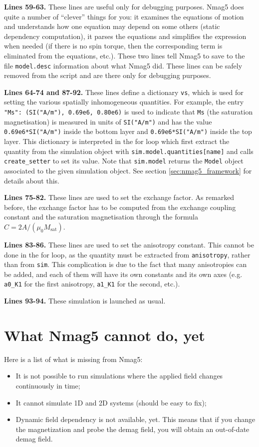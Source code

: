 \documentclass[11pt,oneside,openany]{article}
\newcommand{\Ms}{M_{\mathrm{sat}}}
\begin{document}
\textbf{Lines 59-63.} These lines are useful only for debugging purposes.
Nmag5 does quite a number of ``clever'' things for you: it examines
the equations of motion and understands how one equation may depend on
some others (static dependency computation), it parses the equations
and simplifies the expression when needed (if there is no spin torque, then
the corresponding term is eliminated from the equations, etc.).
These two lines tell Nmag5 to save to the file \verb|model.desc| information
about what Nmag5 did. These lines can be safely removed from the script
and are there only for debugging purposes.

\textbf{Lines 64-74 and 87-92.} These lines define a dictionary \verb|vs|,
which is used for setting the various spatially inhomogeneous quantities. For
example, the entry \verb|"Ms": (SI("A/m"), 0.69e6, 0.80e6)| is used to indicate
that \verb|Ms| (the saturation magnetisation) is measured in units of
\verb|SI("A/m")| and has the value \verb|0.69e6*SI("A/m")| inside the bottom
layer and \verb|0.69e6*SI("A/m")| inside the top layer. This dictionary is
interpreted in the for loop which first extract the quantity from the
simulation object with \verb|sim.model.quantities[name]| and calls
\verb|create_setter| to set its value. Note that \verb|sim.model| returns
the \verb|Model| object associated to the given simulation object.
See section \ref{sec:nmag5_framework} for details about this.

\textbf{Lines 75-82.} These lines are used to set the exchange factor.
As remarked before, the exchange factor has to be computed from the
exchange coupling constant and the saturation magnetisation through
the formula $C = 2A/(\mu_0 \Ms)$.

\textbf{Lines 83-86.} These lines are used to set the anisotropy constant.
This cannot be done in the for loop, as the quantity must be extracted from
\verb|anisotropy|, rather than from \verb|sim|. This complication is due
to the fact that many anisotropies can be added, and each of them will have
its own constants and its own axes (e.g. \verb|a0_K1| for the first
anisotropy, \verb|a1_K1| for the second, etc.).

\textbf{Lines 93-94.} These simulation is launched as usual.

\section{What Nmag5 cannot do, yet} \label{sec:missing_from_nmag5}
Here is a list of what is missing from Nmag5:
\begin{itemize}
\item It is not possible to run simulations where the applied field
  changes continuously in time;
\item It cannot simulate 1D and 2D systems (should be easy to fix);
\item Dynamic field dependency is not available, yet. This means that
  if you change the magnetization and probe the demag field, you will
  obtain an out-of-date demag field.
\end{itemize}
\end{document}

